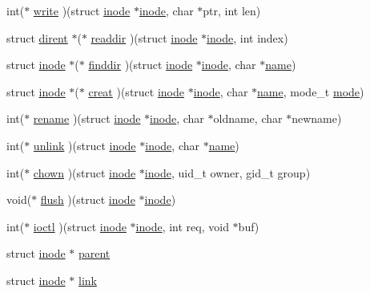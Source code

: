 \begin{DoxyCompactItemize}
int($\ast$ \hyperlink{structinode_a53a123d38834fa17e7ef5c1e5f47bba2}{write} )(struct \hyperlink{structinode}{inode} $\ast$\hyperlink{structinode}{inode}, char $\ast$ptr, int len)
\item 
struct \hyperlink{structdirent}{dirent} $\ast$($\ast$ \hyperlink{structinode_a0a54c11571f19f23322f3e6ad3ecb113}{readdir} )(struct \hyperlink{structinode}{inode} $\ast$\hyperlink{structinode}{inode}, int index)
\item 
struct \hyperlink{structinode}{inode} $\ast$($\ast$ \hyperlink{structinode_ab6c5e2d912fdbd506086e53185cd370d}{finddir} )(struct \hyperlink{structinode}{inode} $\ast$\hyperlink{structinode}{inode}, char $\ast$\hyperlink{structinode_ad64802d9d4ebdd1c56af5ab6e302faf0}{name})
\item 
struct \hyperlink{structinode}{inode} $\ast$($\ast$ \hyperlink{structinode_ad622a049b34780786d9ba4311b06b3b4}{creat} )(struct \hyperlink{structinode}{inode} $\ast$\hyperlink{structinode}{inode}, char $\ast$\hyperlink{structinode_ad64802d9d4ebdd1c56af5ab6e302faf0}{name}, mode\+\_\+t \hyperlink{structinode_a4902d9f6a1d7bd79c6f1bb73d83ce8e3}{mode})
\item 
int($\ast$ \hyperlink{structinode_a5a309a9c4ada7e4d062162b06125a929}{rename} )(struct \hyperlink{structinode}{inode} $\ast$\hyperlink{structinode}{inode}, char $\ast$oldname, char $\ast$newname)
\item 
int($\ast$ \hyperlink{structinode_adf65bac80736631b8000d3d34e953aaa}{unlink} )(struct \hyperlink{structinode}{inode} $\ast$\hyperlink{structinode}{inode}, char $\ast$\hyperlink{structinode_ad64802d9d4ebdd1c56af5ab6e302faf0}{name})
\item 
int($\ast$ \hyperlink{structinode_a8221183a697c9f2b4e0e295f5a9d8afd}{chown} )(struct \hyperlink{structinode}{inode} $\ast$\hyperlink{structinode}{inode}, uid\+\_\+t owner, gid\+\_\+t group)
\item 
void($\ast$ \hyperlink{structinode_ae2972ef183f5c39aac7cb83b9f8a04a8}{flush} )(struct \hyperlink{structinode}{inode} $\ast$\hyperlink{structinode}{inode})
\item 
int($\ast$ \hyperlink{structinode_a636843da203574bc338b016758bf8c7e}{ioctl} )(struct \hyperlink{structinode}{inode} $\ast$\hyperlink{structinode}{inode}, int req, void $\ast$buf)
\item 
struct \hyperlink{structinode}{inode} $\ast$ \hyperlink{structinode_a2d4fac4ae14332628e6fa2bd55dd3121}{parent}
\item 
struct \hyperlink{structinode}{inode} $\ast$ \hyperlink{structinode_a3533c53c5391601c66b3ae0f389c0843}{link}
\end{DoxyCompactItemize}


